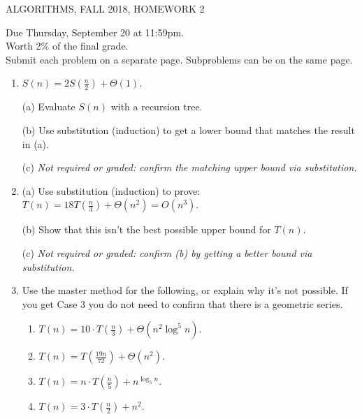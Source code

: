 \documentclass[12pt]{article}
\begin{document}
  
\pagestyle{empty}
 

\begin{center} ALGORITHMS,   FALL 2018, HOMEWORK 2
\end{center}
\noindent Due Thursday, September 20 at 11:59pm.  \\
Worth 2\% of the final grade.\\
Submit each problem on a separate page. Subproblems can be on the same page.

\begin{enumerate}

\item
$S(n) = 2S(\frac{n}{2})  + \Theta(1)$.  

(a) Evaluate $S(n)$ with a recursion tree. 

(b) Use substitution (induction) to get a lower bound that matches the result in (a).    

(c)  {\em Not required or graded:    confirm the  matching upper bound via substitution.}\\




 \item (a) Use  substitution (induction)  to prove: $T(n) = 18T(\frac{n}{3}) + \Theta(n^2)  = O(n^3)$.   
 
(b) Show that this isn't the best possible upper bound for $T(n)$. 

 (c) {\em  Not required or graded: confirm (b) by getting a better bound via substitution.}\\



\item Use the master method for the following, or explain why it's not possible.  If you get Case 3 you  do not need to confirm that there is a geometric series.
\begin{enumerate}

\itemsep-0.35cm

\item  $T(n)= 10\cdot T(\frac{n}{3}) + \Theta(n^2\log^5 n)$.\\

\item $T(n) = T(\frac{19n}{72}) + \Theta(n^2)$.\\

\item $T(n) = n\cdot T(\frac{n}{5}) + n^{\log_5 n}$.\\

\item  $T(n) =  3\cdot T(\frac{n}{2}) + n^2$.\\
  

\end{enumerate}
\end{enumerate}
\end{document}
